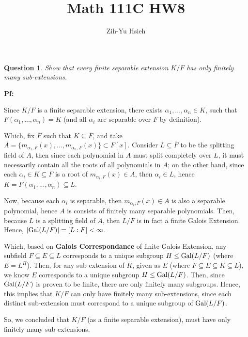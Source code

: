 \documentclass{article}
\title{Math 111C HW8}
\author{Zih-Yu Hsieh}
\newtheorem{question}{Question}
\newcommand{\Gal}{\textmd{Gal}}
\begin{document}
\maketitle

\section{}%
\begin{question}\label{q1}
    Show that every finite separable extension $K/F$ has only finitely many sub-extensions.
\end{question}

\textbf{Pf:}

Since $K/F$ is a finite separable extension, there exists $\alpha_1,...,\alpha_n\in K$, such that $F(\alpha_1,...,\alpha_n)=K$ (and all $\alpha_i$ are separable over $F$ by definition).

Which, fix $\overline{F}$ such that $K\subseteq\overline{F}$, and take $A=\{m_{\alpha_1,F}(x),...,m_{\alpha_n,F}(x)\}\subset F[x]$. Consider $L\subseteq\overline{F}$ to be the splitting field of $A$, then since each polynomial in $A$ must split completely over $L$, it must necessarily contain all the roots of all polynomials in $A$; on the other hand, since each $\alpha_i\in K\subseteq \overline{F}$ is a root of $m_{\alpha_i,F}(x)\in A$, then $\alpha_i\in L$, hence $K=F(\alpha_1,...,\alpha_n)\subseteq L$.

Now, because each $\alpha_i$ is separable, then $m_{\alpha_i,F}(x)\in A$ is also a separable polynomial, hence $A$ is consists of finitely many separable polynomials. Then, because $L$ is a splitting field of $A$, then $L/F$ is in fact a finite Galois Extension. Hence, $|\Gal(L/F)| = [L:F]<\infty$.

Which, based on \textbf{Galois Correspondance} of finite Galois Extension, any subfield $F\subseteq E\subseteq L$ corresponds to a unique subgroup $H\leq \Gal(L/F)$ (where $E=L^H$). Then, for any sub-extension of $K$, given as $E$ (where $F\subseteq E\subseteq K\subseteq L$), we know $E$ corresponds to a unique subgroup $H\leq \Gal(L/F)$.
Then, since $\Gal(L/F)$ is proven to be finite, there are only finitely many subgroups. Hence, this implies that $K/F$ can only have finitely many sub-extensions, since each distinct sub-extension must correspond to a unique subgroup of $\Gal(L/F)$.

So, we concluded that $K/F$ (as a finite separable extension), must have only finitely many sub-extensions.

\break
\end{document}
